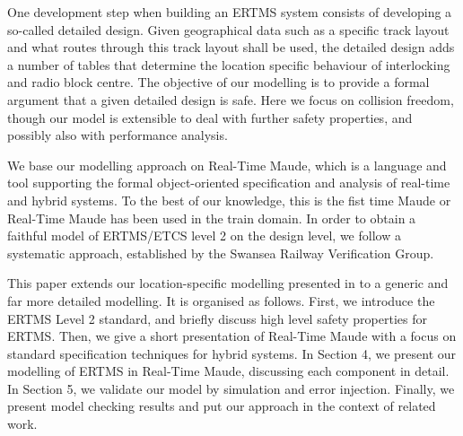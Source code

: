 One development step when building an ERTMS system consists of
developing a so-called detailed design. Given geographical data such
as a specific track layout and what routes through this track layout
shall be used, the detailed design adds a number of tables that
determine the location specific behaviour of interlocking and radio
block centre. The objective of our modelling is to provide a formal
argument that a given detailed design is safe. Here we focus on
collision freedom, though our model is extensible to deal with 
further safety properties, and possibly also with performance
analysis.

We base our modelling approach on Real-Time Maude, which is a language
and tool supporting the formal object-oriented specification and
analysis of real-time and hybrid systems. To the best of our
knowledge, this is the fist time Maude or Real-Time Maude has been
used in the train domain. In order to obtain a faithful model of
ERTMS/ETCS level 2 on the design level, we follow a systematic
approach, established by the Swansea Railway Verification
Group.

This paper extends our location-specific modelling presented in
\cite{old} to a generic and far more detailed modelling. It is
organised as follows. First, we introduce the ERTMS Level 2 standard,
and briefly discuss high level safety properties for ERTMS. Then, we
give a short presentation of Real-Time Maude with a focus on standard
specification techniques for hybrid systems. In Section 4, we present
our modelling of ERTMS in Real-Time Maude, discussing each component
in detail. In Section 5, we validate our model by simulation and
error injection. Finally, we present model checking results and put
our approach in the context of related work.

